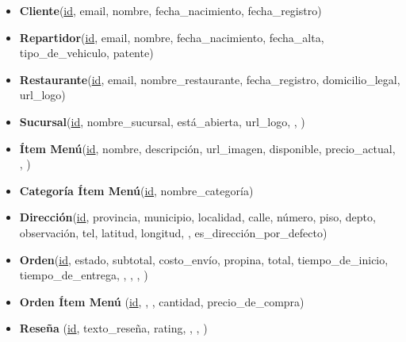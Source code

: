 \begin{itemize}
    \item \textbf{Cliente}(\underline{id}, email, nombre, fecha\_nacimiento, fecha\_registro)
    
    \item \textbf{Repartidor}(\underline{id}, email, nombre, fecha\_nacimiento, fecha\_alta, tipo\_de\_vehiculo, patente)
    
    \item \textbf{Restaurante}(\underline{id}, email, nombre\_restaurante, fecha\_registro, domicilio\_legal, url\_logo)
    
    \item \textbf{Sucursal}(\underline{id}, nombre\_sucursal, está\_abierta, url\_logo, , )
    
    \item \textbf{Ítem Menú}(\underline{id}, nombre, descripción, url\_imagen, disponible, precio\_actual, , )
    
    \item \textbf{Categoría Ítem Menú}(\underline{id}, nombre\_categoría)
    
    \item \textbf{Dirección}(\underline{id}, provincia, municipio, localidad, calle, número, piso, depto, observación, tel, latitud, longitud, , es\_dirección\_por\_defecto)
    
    \item \textbf{Orden}(\underline{id}, estado, subtotal, costo\_envío, propina, total, tiempo\_de\_inicio, tiempo\_de\_entrega, , , , )
    
    \item \textbf{Orden Ítem Menú} (\underline{id}, , , cantidad, precio\_de\_compra)
    
    \item \textbf{Reseña} (\underline{id}, texto\_reseña, rating, , , )
\end{itemize}
